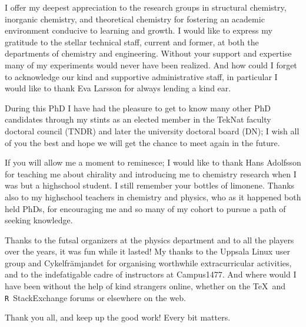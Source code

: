\documentclass[webedition,openright,titles,swedish,english]{LuaUUThesis}\usepackage[]{graphicx}\usepackage[]{xcolor}
\newcommand{\R}{\texttt{R}}
\begin{document}
I offer my deepest appreciation to the research groups in structural chemistry,
inorganic chemistry, and theoretical chemistry for fostering an academic environment
conducive to learning and growth.
I would like to express my gratitude to the stellar technical staff, current
and former, at both the departments of chemistry and engineering.
Without your support and expertise many of my experiments would
never have been realized.
And how could I forget to acknowledge our kind and supportive administrative staff,
in particular I would like to thank Eva Larsson for always lending a kind ear.

During this PhD I have had the pleasure to get to know many other PhD candidates
through my stints as an elected member in the TekNat faculty doctoral council (TNDR)
and later the university doctoral board (DN); I wish all of you the best and hope we will
get the chance to meet again in the future.

If you will allow me a moment to reminesce; I would like to thank
Hans Adolfsson  for teaching me about chirality
and introducing me to chemistry research when I was but a highschool student.
I still remember your bottles of limonene.
Thanks also to my highschool teachers in chemistry and physics,
who as it happened both held PhDs, for encouraging me and so many of my cohort
to pursue a path of seeking knowledge.


Thanks to the futsal organizers at the physics department and to all the players
over the years, it was fun while it lasted!
My thanks to the Uppsala Linux user group and Cykelfrämjandet for organising
worthwhile extracurricular activities, and to the indefatigable cadre of
instructors at Campus1477.
And where would I have been without the help of kind strangers online, whether
on the \TeX\ and \R\ StackExchange forums or elsewhere on the web.

Thank you all, and keep up the good work! Every bit matters.


\egroup


\printbibliography[%
   title=References,%
   heading=bibintoc%
]


\cleardoublepage
\begingroup
   \let\cleardoublepage\relax

   \setcounter{lofdepth}{1}
   \renewcommand{\listfigurename}{List of figures}
   \addcontentsline{toc}{chapter}{\listfigurename}
   \listoffigures
\end{document}
